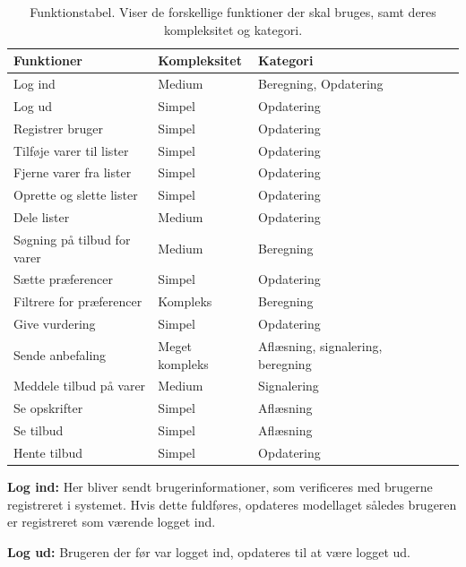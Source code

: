 \begin{table}[H]
  \centering
      \begin{tabular}{l|lllll}
      \textbf{Funktioner}			& {Kompleksitet}	& {Kategori}  	\\ \hline
      Log ind						& Medium			& Beregning, Opdatering		\\
      Log ud						& Simpel			& Opdatering	\\
      Registrer bruger				& Simpel			& Opdatering	\\
      Tilføje varer til lister		& Simpel       		& Opdatering	\\
      Fjerne varer fra lister		& Simpel       		& Opdatering	\\
      Oprette og slette lister		& Simpel       		& Opdatering	\\
      Dele lister					& Medium       		& Opdatering	\\
      Søgning på tilbud for varer   & Medium     		& Beregning		\\
      Sætte præferencer				& Simpel       		& Opdatering	\\
      Filtrere for præferencer		& Kompleks     		& Beregning		\\
      Give vurdering				& Simpel       		& Opdatering	\\
      Sende anbefaling				& Meget kompleks	& Aflæsning, signalering, beregning		\\
      Meddele tilbud på varer		& Medium      		& Signalering	\\
	  Se opskrifter					& Simpel       		& Aflæsning		\\
	  Se tilbud						& Simpel       		& Aflæsning		\\
      Hente tilbud					& Simpel	       	& Opdatering	\\
    \end{tabular}
  \caption{Funktionstabel. Viser de forskellige funktioner der skal bruges, samt deres kompleksitet og kategori.}\label{tabel:functionstable}
\end{table}

\textbf{Log ind:} Her bliver sendt brugerinformationer, som verificeres med brugerne registreret i systemet.
Hvis dette fuldføres, opdateres modellaget således brugeren er registreret som værende logget ind.

\textbf{Log ud:} Brugeren der før var logget ind, opdateres til at være logget ud.

